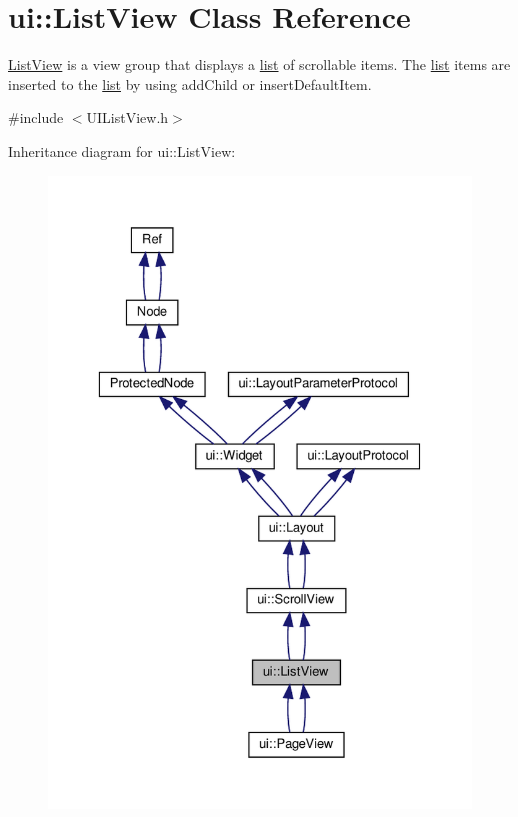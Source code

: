 \hypertarget{classui_1_1ListView}{}\section{ui\+:\+:List\+View Class Reference}
\label{classui_1_1ListView}


\hyperlink{classui_1_1ListView}{List\+View} is a view group that displays a \hyperlink{protocollist-p}{list} of scrollable items. The \hyperlink{protocollist-p}{list} items are inserted to the \hyperlink{protocollist-p}{list} by using {\ttfamily add\+Child} or {\ttfamily insert\+Default\+Item}.  




{\ttfamily \#include $<$U\+I\+List\+View.\+h$>$}



Inheritance diagram for ui\+:\+:List\+View\+:
\nopagebreak
\begin{figure}[H]
\begin{center}
\leavevmode
\includegraphics[width=329pt]{classui_1_1ListView__inherit__graph}
\end{center}
\end{figure}


